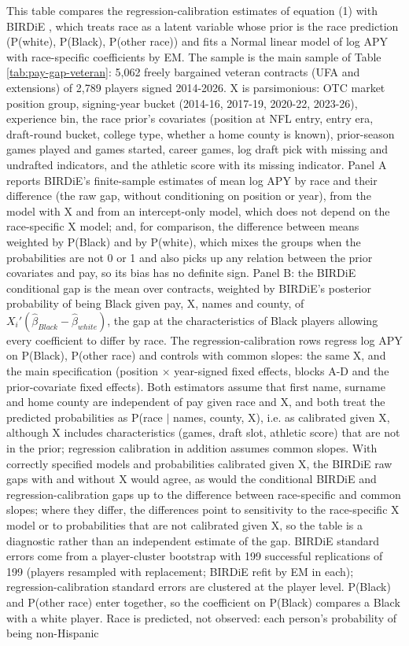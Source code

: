 \begin{table}[!h]
\begin{threeparttable}
\begin{tablenotes}[para]
\item This table compares the regression-calibration estimates of equation (1) with BIRDiE \citep{mccartan2025birdie}, which treats race as a latent variable whose prior is the race prediction (P(white), P(Black), P(other race)) and fits a Normal linear model of log APY with race-specific coefficients by EM. The sample is the main sample of Table \ref{tab:pay-gap-veteran}: 5,062 freely bargained veteran contracts (UFA and extensions) of 2,789 players signed 2014-2026. X is parsimonious: OTC market position group, signing-year bucket (2014-16, 2017-19, 2020-22, 2023-26), experience bin, the race prior's covariates (position at NFL entry, entry era, draft-round bucket, college type, whether a home county is known), prior-season games played and games started, career games, log draft pick with missing and undrafted indicators, and the athletic score with its missing indicator. Panel A reports BIRDiE's finite-sample estimates of mean log APY by race and their difference (the raw gap, without conditioning on position or year), from the model with X and from an intercept-only model, which does not depend on the race-specific X model; and, for comparison, the difference between means weighted by P(Black) and by P(white), which mixes the groups when the probabilities are not 0 or 1 and also picks up any relation between the prior covariates and pay, so its bias has no definite sign. Panel B: the BIRDiE conditional gap is the mean over contracts, weighted by BIRDiE's posterior probability of being Black given pay, X, names and county, of $X_i'(\hat\beta_{Black} - \hat\beta_{white})$, the gap at the characteristics of Black players allowing every coefficient to differ by race. The regression-calibration rows regress log APY on P(Black), P(other race) and controls with common slopes: the same X, and the main specification (position $\times$ year-signed fixed effects, blocks A-D and the prior-covariate fixed effects). Both estimators assume that first name, surname and home county are independent of pay given race and X, and both treat the predicted probabilities as P(race $|$ names, county, X), i.e. as calibrated given X, although X includes characteristics (games, draft slot, athletic score) that are not in the prior; regression calibration in addition assumes common slopes. With correctly specified models and probabilities calibrated given X, the BIRDiE raw gaps with and without X would agree, as would the conditional BIRDiE and regression-calibration gaps up to the difference between race-specific and common slopes; where they differ, the differences point to sensitivity to the race-specific X model or to probabilities that are not calibrated given X, so the table is a diagnostic rather than an independent estimate of the gap. BIRDiE standard errors come from a player-cluster bootstrap with 199 successful replications of 199 (players resampled with replacement; BIRDiE refit by EM in each); regression-calibration standard errors are clustered at the player level. P(Black) and P(other race) enter together, so the coefficient on P(Black) compares a Black with a white player. Race is predicted, not observed: each person's probability of being non-Hispanic 
\end{tablenotes}
\end{threeparttable}
\end{table}
